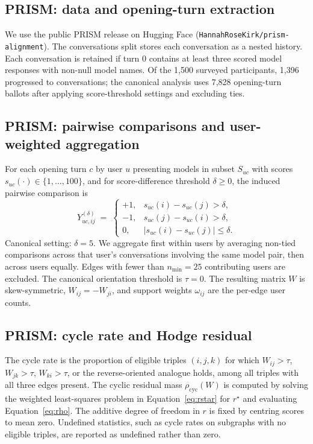\documentclass[10pt]{article}
\theoremstyle{definition}
\theoremstyle{remark}
\begin{document}
\subsection*{PRISM: data and opening-turn extraction}

We use the public PRISM release on Hugging Face (\texttt{HannahRoseKirk/prism-alignment})\cite{kirk2024}. The conversations split stores each conversation as a nested history. Each conversation is retained if turn 0 contains at least three scored model responses with non-null model names. Of the 1,500 surveyed participants, 1,396 progressed to conversations; the canonical analysis uses 7,828 opening-turn ballots after applying score-threshold settings and excluding ties.

\subsection*{PRISM: pairwise comparisons and user-weighted aggregation}

For each opening turn $c$ by user $u$ presenting models in subset $S_{uc}$ with scores $s_{uc}(\cdot)\in\{1,\ldots,100\}$, and for score-difference threshold $\delta\geq 0$, the induced pairwise comparison is
\[
Y^{(\delta)}_{uc,ij} \;=\;
\begin{cases}
+1, & s_{uc}(i)-s_{uc}(j)>\delta,\\
-1, & s_{uc}(j)-s_{uc}(i)>\delta,\\
0,  & |s_{uc}(i)-s_{uc}(j)|\leq\delta.
\end{cases}
\]
Canonical setting: $\delta=5$. We aggregate first within users by averaging non-tied comparisons across that user's conversations involving the same model pair, then across users equally. Edges with fewer than $n_{\min}=25$ contributing users are excluded. The canonical orientation threshold is $\tau=0$. The resulting matrix $W$ is skew-symmetric, $W_{ij}=-W_{ji}$, and support weights $\omega_{ij}$ are the per-edge user counts.

\subsection*{PRISM: cycle rate and Hodge residual}

The cycle rate is the proportion of eligible triples $(i,j,k)$ for which $W_{ij}>\tau$, $W_{jk}>\tau$, $W_{ki}>\tau$, or the reverse-oriented analogue holds, among all triples with all three edges present. The cyclic residual mass $\rho_{\mathrm{cyc}}(W)$ is computed by solving the weighted least-squares problem in Equation~\eqref{eq:rstar} for $r^\star$ and evaluating Equation~\eqref{eq:rho}. The additive degree of freedom in $r$ is fixed by centring scores to mean zero. Undefined statistics, such as cycle rates on subgraphs with no eligible triples, are reported as undefined rather than zero.
\end{document}
